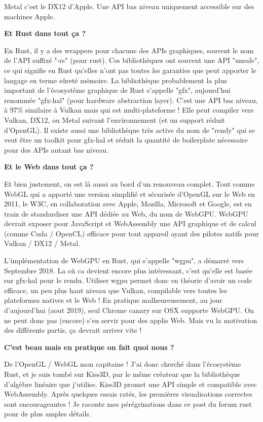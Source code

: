 Metal c'est le DX12 d'Apple. Une API bas niveau uniquement accessible sur des machines Apple.

\textbf{Et Rust dans tout ça ?}

En Rust, il y a des wrappers pour chacune des APIs graphiques, souvent le nom de l'API suffixé "-rs" (pour rust). Ces bibliothèques ont souvent une API "unsafe", ce qui signifie en Rust qu'elles n'ont pas toutes les garanties que peut apporter le langage en terme sûreté mémoire. La bibliothèque probablement la plus important de l'écosystème graphique de Rust s'appelle "gfx", aujourd'hui renommée "gfx-hal" (pour hardware abstraction layer). C'est une API bas niveau, à 97\% similaire à Vulkan mais qui est multi-plateforme ! Elle peut compiler vers Vulkan, DX12, ou Metal suivant l'environnement (et un support réduit d'OpenGL). Il existe aussi une bibliothèque très active du nom de "rendy" qui se veut être un toolkit pour gfx-hal et réduit la quantité de boilerplate nécessaire pour des APIs autant bas niveau.

\textbf{Et le Web dans tout ça ?}

Et bien justement, on est là aussi au bord d’un renouveau complet. Tout comme WebGL qui a apporté une version simplifié et sécurisée d'OpenGL sur le Web en 2011, le W3C, en collaboration avec Apple, Mozilla, Microsoft et Google, est en train de standardiser une API dédiée au Web, du nom de WebGPU. WebGPU devrait exposer pour JavaScript et WebAssembly une API graphique et de calcul (comme Cuda / OpenCL) efficace pour tout appareil ayant des pilotes natifs pour Vulkan / DX12 / Metal.

L'implémentation de WebGPU en Rust, qui s'appelle "wgpu", a démarré vers Septembre 2018. La où ca devient encore plus intéressant, c'est qu'elle est basée sur gfx-hal pour le rendu. Utiliser wgpu permet donc en théorie d'avoir un code efficace, un peu plus haut niveau que Vulkan, compilable vers toutes les plateformes natives et le Web ! En pratique malheureusement, au jour d'aujourd'hui (aout 2019), seul Chrome canary sur OSX supporte WebGPU. On ne peut donc pas (encore) s'en servir pour des applis Web. Mais vu la motivation des différents partis, ça devrait arriver vite !

\textbf{C’est beau mais en pratique on fait quoi nous ?}

De l'OpenGL / WebGL mon capitaine ! J'ai donc cherché dans l'écosystème Rust, et je suis tombé sur Kiss3D, par le même créateur que la bibliothèque d'algèbre linéaire que j'utilise. Kiss3D promet une API simple et compatible avec WebAssembly. Après quelques essais ratés, les premières visualisations correctes sont encourageantes ! Je raconte mes pérégrinations dans ce post du forum rust pour de plus amples détails.


